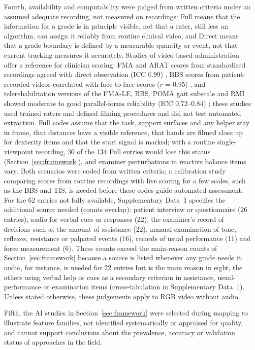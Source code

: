 \documentclass[11pt]{article}
\begin{document}
Fourth, availability and computability were judged from written criteria under an assumed adequate recording, not measured on recordings: Full means that the information for a grade is in principle visible, not that a rater, still less an algorithm, can assign it reliably from routine clinical video, and Direct means that a grade boundary is defined by a measurable quantity or event, not that current tracking measures it accurately. Studies of video-based administration offer a reference for clinician scoring: FMA and ARAT scores from standardised recordings agreed with direct observation (ICC 0.99) \cite{Amano2018RemoteFMAARAT}, BBS scores from patient-recorded videos correlated with face-to-face scores ($r$ = 0.95) \cite{Onal2025TeleBBS}, and telerehabilitation versions of the FMA-LE, BBS, POMA gait subscale and RMI showed moderate to good parallel-forms reliability (ICC 0.72--0.84) \cite{Zhang2024TeleMobilityScales}; these studies used trained raters and defined filming procedures and did not test automated extraction. Full codes assume that the task, support surfaces and any helper stay in frame, that distances have a visible reference, that hands are filmed close up for dexterity items and that the start signal is marked; with a routine single-viewpoint recording, 30 of the 134 Full entries would lose this status (Section~\ref{sec:framework}), and examiner perturbations in reactive balance items vary. Both scenarios were coded from written criteria; a calibration study comparing scores from routine recordings with live scoring for a few scales, such as the BBS and TIS, is needed before these codes guide automated assessment. For the 62 entries not fully available, Supplementary Data~1 specifies the additional source needed (counts overlap): patient interview or questionnaire (26 entries), audio for verbal cues or responses (22), the examiner's record of decisions such as the amount of assistance (22), manual examination of tone, reflexes, resistance or palpated events (16), records of usual performance (11) and force measurement (6). These counts exceed the main-reason counts of Section~\ref{sec:framework} because a source is listed whenever any grade needs it: audio, for instance, is needed for 22 entries but is the main reason in eight, the others using verbal help or cues as a secondary criterion in assistance, usual-performance or examination items (cross-tabulation in Supplementary Data~1). Unless stated otherwise, these judgements apply to RGB video without audio.

Fifth, the AI studies in Section~\ref{sec:framework} were selected during mapping to illustrate feature families, not identified systematically or appraised for quality, and cannot support conclusions about the prevalence, accuracy or validation status of approaches in the field.
\end{document}
